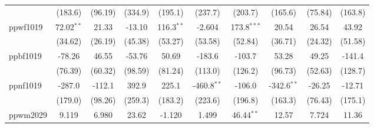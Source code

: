 \begin{table}[htbp]
\begin{tabular}{lccccccccc}
                                     & (183.6)                      & (96.19)                       & (334.9)                     & (195.1)                   & (237.7)                       & (203.7)                      & (165.6)                       & (75.84)                      & (163.8)\\   
      ppwf1019                       & 72.02$^{**}$                 & 21.33                         & -13.10                      & 116.3$^{**}$              & -2.604                        & 173.8$^{***}$                & 20.54                         & 26.54                        & 43.92\\   
                                     & (34.62)                      & (26.19)                       & (45.38)                     & (53.27)                   & (53.58)                       & (52.84)                      & (36.71)                       & (24.32)                      & (51.58)\\   
      ppbf1019                       & -78.26                       & 46.55                         & -53.76                      & 50.69                     & -183.6                        & -103.7                       & 53.28                         & 49.25                        & -141.4\\   
                                     & (76.39)                      & (60.32)                       & (98.59)                     & (81.24)                   & (113.0)                       & (126.2)                      & (96.73)                       & (52.63)                      & (128.7)\\   
      ppnf1019                       & -287.0                       & -112.1                        & 392.9                       & 225.1                     & -460.8$^{**}$                 & -106.0                       & -342.6$^{**}$                 & -26.25                       & -12.71\\   
                                     & (179.0)                      & (98.26)                       & (259.3)                     & (183.2)                   & (223.6)                       & (196.8)                      & (163.3)                       & (76.43)                      & (175.1)\\   
      ppwm2029                       & 9.119                        & 6.980                         & 23.62                       & -1.120                    & 1.499                         & 46.44$^{**}$                 & 12.57                         & 7.724                        & 11.36\\   

\end{tabular}
\end{table}
